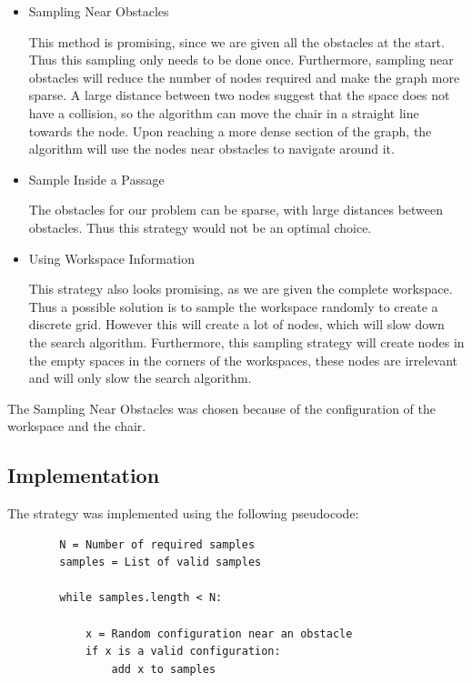 \documentclass[12pt]{article}
\begin{document}
    \begin{itemize}
        \item Sampling Near Obstacles
        
            This method is promising, since we are given all the obstacles at the start. Thus this sampling only needs to be done once. Furthermore, sampling near obstacles will reduce the number of nodes required and make the graph more sparse. 
            A large distance between two nodes suggest that the space does not have a collision, so the algorithm can move the chair in a straight line towards the node.
            Upon reaching a more dense section of the graph, the algorithm will use the nodes near obstacles to navigate around it.

        \item Sample Inside a Passage

            The obstacles for our problem can be sparse, with large distances between obstacles. Thus this strategy would not be an optimal choice.

        \item Using Workspace Information

            This strategy also looks promising, as we are given the complete workspace. Thus a possible solution is to sample the workspace randomly to create a discrete grid. However this will create a lot of nodes, which will slow down the search algorithm.
            Furthermore, this sampling strategy will create nodes in the empty spaces in the corners of the workspaces, these nodes are irrelevant and will only slow the search algorithm.
    \end{itemize}

    The Sampling Near Obstacles was chosen because of the configuration of the workspace and the chair.

    \subsection{Implementation}

    The strategy was implemented using the following pseudocode:

    \begin{lstlisting}
        N = Number of required samples
        samples = List of valid samples

        while samples.length < N:
            
            x = Random configuration near an obstacle
            if x is a valid configuration:
                add x to samples

    \end{lstlisting}
\end{document}
